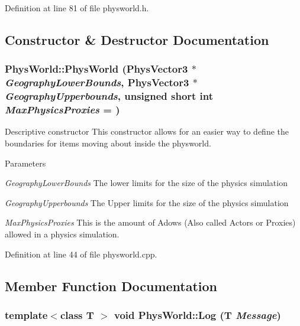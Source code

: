 Definition at line 81 of file physworld.h.

\subsection{Constructor \& Destructor Documentation}
\hypertarget{classPhysWorld_a3228c98369082139722d3c918d735e6c}{
\subsubsection[{PhysWorld}]{\setlength{\rightskip}{0pt plus 5cm}PhysWorld::PhysWorld ({\bf PhysVector3} $\ast$ {\em GeographyLowerBounds}, \/  {\bf PhysVector3} $\ast$ {\em GeographyUpperbounds}, \/  unsigned short int {\em MaxPhysicsProxies} = {})}}
\label{db/df5/classPhysWorld_a3228c98369082139722d3c918d735e6c}


Descriptive constructor This constructor allows for an easier way to define the boundaries for items moving about inside the physworld. 
\begin{DoxyParams}{Parameters}
\item[{\em GeographyLowerBounds}]The lower limits for the size of the physics simulation \item[{\em GeographyUpperbounds}]The Upper limits for the size of the physics simulation \item[{\em MaxPhysicsProxies}]This is the amount of Adows (Also called Actors or Proxies) allowed in a physics simulation. \end{DoxyParams}


Definition at line 44 of file physworld.cpp.

\subsection{Member Function Documentation}
\hypertarget{classPhysWorld_a5e9fead1c3100f5dbd5ca985b82b85ea}{
\subsubsection[{Log}]{\setlength{\rightskip}{0pt plus 5cm}template$<$class T $>$ void PhysWorld::Log (T {\em Message})}}
\label{db/df5/classPhysWorld_a5e9fead1c3100f5dbd5ca985b82b85ea}


